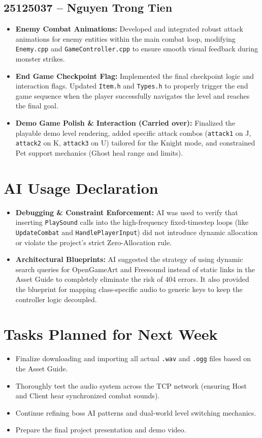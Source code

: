 \documentclass[12pt,a4paper]{article}
\begin{document}
\subsection*{25125037 -- Nguyen Trong Tien}
\begin{itemize}
    \item \textbf{Enemy Combat Animations:} Developed and integrated robust attack animations for enemy entities within the main combat loop, modifying \texttt{Enemy.cpp} and \texttt{GameController.cpp} to ensure smooth visual feedback during monster strikes.
    
    \item \textbf{End Game Checkpoint Flag:} Implemented the final checkpoint logic and interaction flags. Updated \texttt{Item.h} and \texttt{Types.h} to properly trigger the end game sequence when the player successfully navigates the level and reaches the final goal.
    
    \item \textbf{Demo Game Polish \& Interaction (Carried over):} Finalized the playable demo level rendering, added specific attack combos (\texttt{attack1} on J, \texttt{attack2} on K, \texttt{attack3} on U) tailored for the Knight mode, and constrained Pet support mechanics (Ghost heal range and limits).
\end{itemize}

\section*{AI Usage Declaration}
\begin{itemize}
    \item \textbf{Debugging \& Constraint Enforcement:} AI was used to verify that inserting \texttt{PlaySound} calls into the high-frequency fixed-timestep loops (like \texttt{UpdateCombat} and \texttt{HandlePlayerInput}) did not introduce dynamic allocation or violate the project's strict Zero-Allocation rule.
    \item \textbf{Architectural Blueprints:} AI suggested the strategy of using dynamic search queries for OpenGameArt and Freesound instead of static links in the Asset Guide to completely eliminate the risk of 404 errors. It also provided the blueprint for mapping class-specific audio to generic keys to keep the controller logic decoupled.
\end{itemize}

\section*{Tasks Planned for Next Week}
\begin{itemize}
    \item Finalize downloading and importing all actual \texttt{.wav} and \texttt{.ogg} files based on the Asset Guide.
    \item Thoroughly test the audio system across the TCP network (ensuring Host and Client hear synchronized combat sounds).
    \item Continue refining boss AI patterns and dual-world level switching mechanics.
    \item Prepare the final project presentation and demo video.
\end{itemize}
\end{document}
